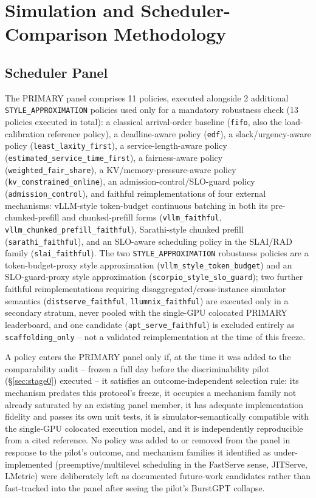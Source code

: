 \section{Simulation and Scheduler-Comparison Methodology}
\label{sec:methodology}

\subsection{Scheduler Panel}
\label{sec:panel}

The PRIMARY panel comprises 11 policies, executed alongside 2 additional
\texttt{STYLE\_APPROXIMATION} policies used only for a mandatory robustness
check (13 policies executed in total): a classical arrival-order baseline
(\texttt{fifo}, also the load-calibration reference policy), a
deadline-aware policy (\texttt{edf}), a slack/urgency-aware policy
(\texttt{least\_laxity\_first}), a service-length-aware policy
(\texttt{estimated\_service\_time\_first}), a fairness-aware policy
(\texttt{weighted\_fair\_share}), a KV/memory-pressure-aware policy
(\texttt{kv\_constrained\_online}), an admission-control/SLO-guard policy
(\texttt{admission\_control}), and faithful reimplementations of four
external mechanisms: vLLM-style token-budget continuous batching in both
its pre-chunked-prefill and chunked-prefill forms
(\texttt{vllm\_faithful}, \texttt{vllm\_chunked\_prefill\_faithful}),
Sarathi-style chunked prefill (\texttt{sarathi\_faithful}), and an
SLO-aware scheduling policy in the SLAI/RAD family
(\texttt{slai\_faithful}). The two \texttt{STYLE\_APPROXIMATION} robustness
policies are a token-budget-proxy style approximation
(\texttt{vllm\_style\_token\_budget}) and an SLO-guard-proxy style
approximation (\texttt{scorpio\_style\_slo\_guard}); two further faithful
reimplementations requiring disaggregated/cross-instance simulator
semantics (\texttt{distserve\_faithful}, \texttt{llumnix\_faithful}) are
executed only in a secondary stratum, never pooled with the single-GPU
colocated PRIMARY leaderboard, and one candidate
(\texttt{apt\_serve\_faithful}) is excluded entirely as
\texttt{scaffolding\_only} -- not a validated reimplementation at the time
of this freeze.

A policy enters the PRIMARY panel only if, at the time it was added to the
comparability audit -- frozen a full day before the discriminability
pilot (\S\ref{sec:stage0}) executed -- it satisfies an outcome-independent
selection rule: its mechanism predates this protocol's freeze, it
occupies a mechanism family not already saturated by an existing panel
member, it has adequate implementation fidelity and passes its own unit
tests, it is simulator-semantically compatible with the single-GPU
colocated execution model, and it is independently reproducible from a
cited reference. No policy was added to or removed from the panel in
response to the pilot's outcome, and mechanism families it identified as
under-implemented (preemptive/multilevel scheduling in the FastServe
sense, JITServe, LMetric) were deliberately left as documented future-work
candidates rather than fast-tracked into the panel after seeing the
pilot's BurstGPT collapse.

